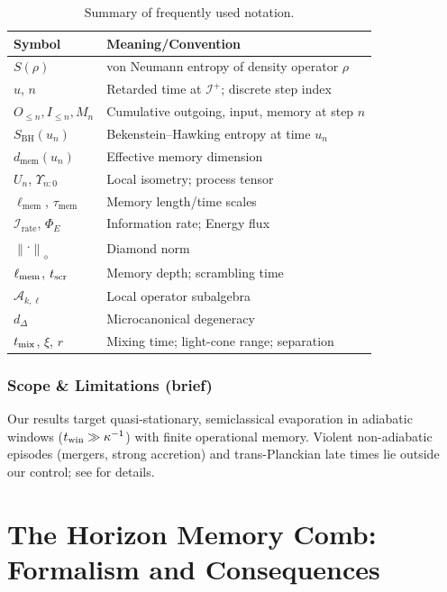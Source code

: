 \documentclass[aps,prd,preprint,onecolumn,superscriptaddress,nofootinbib,longbibliography,floatfix,11pt,showpacs,showkeys]{revtex4-2}
\newcommand{\normD}[1]{\left\lVert #1 \right\rVert_{\diamond}}
\newcommand{\Irate}{\mathcal{I}_{\mathrm{rate}}}
\newcommand{\Eflux}{\Phi_E}
\newcommand{\Ddiamond}[1]{\normD{#1}}
\newcommand{\dmem}{\ensuremath{d_{\mathrm{mem}}}}
\newcommand{\ellmem}{\ensuremath{\ell_{\mathrm{mem}}}}
\newcommand{\taumem}{\ensuremath{\tau_{\mathrm{mem}}}}
\theoremstyle{plain}
\theoremstyle{definition}
\theoremstyle{remark}
\begin{document}
\begin{table}[hbtp]
\centering
\caption{Summary of frequently used notation.}
\label{tab:notation_summary}
\small
\begin{tabular*}{\textwidth}{@{\extracolsep{\fill}}ll@{}}
\toprule
\textbf{Symbol} & \textbf{Meaning/Convention} \\
\midrule
\(S(\rho)\) & von Neumann entropy of density operator \(\rho\) \\
\(u\), \(n\) & Retarded time at \(\mathcal{I}^+\); discrete step index \\
\(O_{\le n}, I_{\le n}, M_n\) & Cumulative outgoing, input, memory at step \(n\) \\
\(S_{\mathrm{BH}}(u_n)\) & Bekenstein--Hawking entropy at time \(u_n\) \\
\(\dmem(u_n)\) & Effective memory dimension \\
\(U_n\), \(\Upsilon_{n{:}0}\) & Local isometry; process tensor \\
\(\ellmem\), \(\taumem\) & Memory length/time scales \\
\(\Irate\), \(\Eflux\) & Information rate; Energy flux \\
\(\Ddiamond{\cdot}\) & Diamond norm \\
\(\ell_{\rm mem}\), \(t_{\rm scr}\) & Memory depth; scrambling time \\
\(\mathscr{A}_{k,\ell}\) & Local operator subalgebra \\
\(d_\Delta\) & Microcanonical degeneracy \\
\(t_{\rm mix}\), \(\xi\), \(r\) & Mixing time; light-cone range; separation \\
\bottomrule
\end{tabular*}
\end{table}


\subsubsection{Scope \& Limitations (brief)} Our results target quasi-stationary, semiclassical evaporation in adiabatic windows ($t_{\rm win}\gg \kappa^{-1}$) with finite operational memory. Violent non-adiabatic episodes (mergers, strong accretion) and trans-Planckian late times lie outside our control; see  for details.
\section{The Horizon Memory Comb: Formalism and Consequences}
\label{sec:formalism_consequences}
\end{document}
